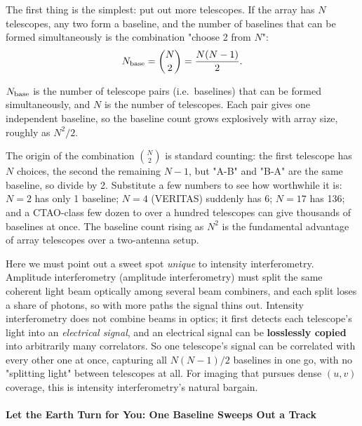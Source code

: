 The first thing is the simplest: put out more telescopes. If the array has \(N\) telescopes, any two form a baseline, and the number of baselines that can be formed simultaneously is the combination "choose 2 from \(N\)":
\begin{equation}
  N_{\rm base}=\binom{N}{2}=\frac{N(N-1)}{2}.
  \label{eq:e11-baseline-number}
\end{equation}
\begin{formulaexplain}
\(N_{\rm base}\) is the number of telescope pairs (i.e.\ baselines) that can be formed simultaneously, and \(N\) is the number of telescopes. Each pair gives one independent baseline, so the baseline count grows explosively with array size, roughly as \(N^2/2\).
\end{formulaexplain}
The origin of the combination \(\binom{N}{2}\) is standard counting: the first telescope has \(N\) choices, the second the remaining \(N-1\), but "A-B" and "B-A" are the same baseline, so divide by 2. Substitute a few numbers to see how worthwhile it is: \(N=2\) has only 1 baseline; \(N=4\) (VERITAS) suddenly has 6; \(N=17\) has 136; and a CTAO-class few dozen to over a hundred telescopes can give thousands of baselines at once. The baseline count rising as \(N^2\) is the fundamental advantage of array telescopes over a two-antenna setup.

Here we must point out a sweet spot \emph{unique} to intensity interferometry. Amplitude interferometry (amplitude interferometry) must split the same coherent light beam optically among several beam combiners, and each split loses a share of photons, so with more paths the signal thins out. Intensity interferometry does not combine beams in optics; it first detects each telescope's light into an \emph{electrical signal}, and an electrical signal can be \textbf{losslessly copied} into arbitrarily many correlators. So one telescope's signal can be correlated with every other one at once, capturing all \(N(N-1)/2\) baselines in one go, with no "splitting light" between telescopes at all. For imaging that pursues dense \((u,v)\) coverage, this is intensity interferometry's natural bargain.

\paragraph{Let the Earth Turn for You: One Baseline Sweeps Out a Track}
\label{sec:e11-earth-rotation}

